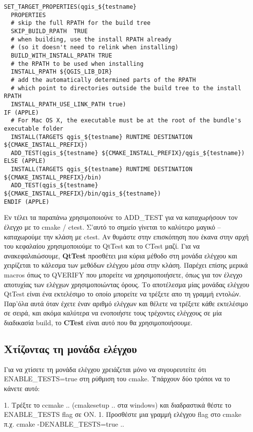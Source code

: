 \begin{verbatim}
SET_TARGET_PROPERTIES(qgis_${testname}
  PROPERTIES
  # skip the full RPATH for the build tree
  SKIP_BUILD_RPATH  TRUE
  # when building, use the install RPATH already
  # (so it doesn't need to relink when installing)
  BUILD_WITH_INSTALL_RPATH TRUE
  # the RPATH to be used when installing
  INSTALL_RPATH ${QGIS_LIB_DIR}
  # add the automatically determined parts of the RPATH
  # which point to directories outside the build tree to the install RPATH
  INSTALL_RPATH_USE_LINK_PATH true)
IF (APPLE)
  # For Mac OS X, the executable must be at the root of the bundle's executable folder
  INSTALL(TARGETS qgis_${testname} RUNTIME DESTINATION ${CMAKE_INSTALL_PREFIX})
  ADD_TEST(qgis_${testname} ${CMAKE_INSTALL_PREFIX}/qgis_${testname})
ELSE (APPLE)
  INSTALL(TARGETS qgis_${testname} RUNTIME DESTINATION ${CMAKE_INSTALL_PREFIX}/bin)
  ADD_TEST(qgis_${testname} ${CMAKE_INSTALL_PREFIX}/bin/qgis_${testname})
ENDIF (APPLE)
\end{verbatim}

Εν τέλει τα παραπάνω χρησιμοποιούνε το ADD_TEST για να καταχωρήσουν τον έλεγχο με το cmake / ctest. Σ'αυτό το σημείο γίνεται το καλύτερο μαγικό – καταχωρούμε την κλάση με ctest. Αν θυμάστε στην επισκόπηση που έκανα στην αρχή του κεφαλαίου χρησιμοποιούμε το QtTest και το CTest μαζί. Για να ανακεφαλαιώσουμε, \textbf{QtTest} προσθέτει μια κύρια μέθοδο στη μονάδα ελέγχου και χειρίζεται το κάλεσμα των μεθόδων ελέγχου μέσα στην κλάση. Παρέχει επίσης μερικά macros όπως το QVERIFY που μπορείτε να χρησιμοποιήσετε, όπως για τον έλεγχο αποτυχίας των ελέγχων χρησιμοποιώντας όρους. Το αποτέλεσμα μίας μονάδας ελέγχου QtTest είναι ένα εκτελέσιμο το οποίο μπορείτε να τρέξετε απο τη γραμμή εντολών. Παρ'όλα αυτά όταν έχετε έναν αριθμό ελέγχων και θέλετε να τρέξετε κάθε εκτελέσιμο σε σειρά, και ακόμα καλύτερα να ενοποιήστε τους τρέχοντες ελέγχους σε μία διαδικασία build, το \textbf{CTest} είναι αυτό που θα χρησιμοποιήσουμε. 

\hypertarget{toc52}{}
\subsection{Χτίζοντας τη μονάδα ελέγχου}
Για να χτίσετε τη μονάδα ελέγχου χρειάζεται μόνο να σιγουρευτείτε ότι ENABLE\_TESTS=true στη ρύθμιση του cmake. Υπάρχουν δύο τρόποι να το κάνετε αυτό:

 1. Τρέξτε το ccmake .. (cmakesetup .. στα windows) και διαδραστικά θέστε το ENABLE\_TESTS flag σε ON.
 1. Προσθέστε μια γραμμή ελέγχου flag στο cmake π.χ. cmake -DENABLE\_TESTS=true ..

